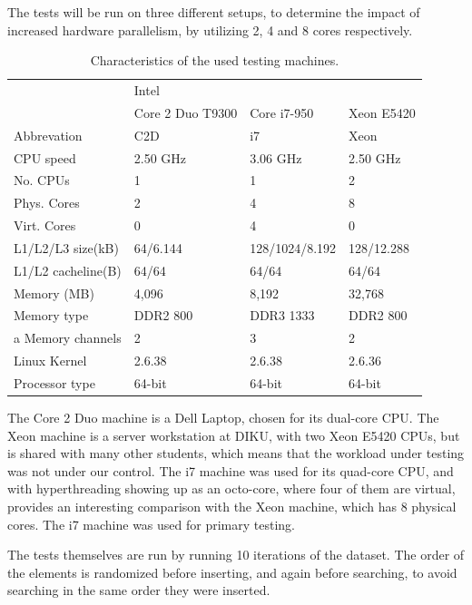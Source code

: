 The tests will be run on three different setups, to determine the impact of
increased hardware parallelism, by utilizing 2, 4 and 8 cores respectively.

\begin{table}[h!]
    \centering
    \begin{tabular}[here]{ l l l l }
        \hline
                  & Intel \\\cline{2-4}
                  & Core 2 Duo T9300 & Core i7-950  & Xeon E5420 \\ \hline
        Abbrevation & C2D & i7 & Xeon \\ 
        CPU speed   & 2.50 GHz & 3.06 GHz & 2.50 GHz \\
        No. CPUs    & 1 & 1 & 2 \\
        Phys. Cores & 2 & 4 & 8 \\
        Virt. Cores & 0 & 4 & 0 \\
        L1/L2/L3 size(kB) & 64/6.144 & 128/1024/8.192 & 128/12.288\\
        L1/L2 cacheline(B) & 64/64 & 64/64 & 64/64\\
        Memory (MB) & 4,096 & 8,192 & 32,768 \\
        Memory type & DDR2 800 & DDR3 1333 & DDR2 800 \\a
        Memory channels & 2 & 3 & 2 \\
        Linux Kernel    & 2.6.38 & 2.6.38 & 2.6.36 \\
        Processor type  & 64-bit & 64-bit & 64-bit \\\hline
    \end{tabular}
    \caption{Characteristics of the used testing machines.}
    \label{tab:cpucpecs}
\end{table}

The Core 2 Duo machine is a Dell Laptop, chosen for its dual-core CPU.
The Xeon machine is a server workstation at DIKU, with two Xeon E5420 CPUs,
but is shared with many other students, which means that the workload
under testing was not under our control. The i7 machine was used for its
quad-core CPU, and with hyperthreading showing up as an octo-core, where four
of them are virtual, provides an interesting comparison with the Xeon machine,
which has 8 physical cores. The i7 machine was used for primary testing.

The tests themselves are run by running 10 iterations of the dataset. The order
of the elements is randomized before inserting, and again before searching, to
avoid searching in the same order they were inserted.



